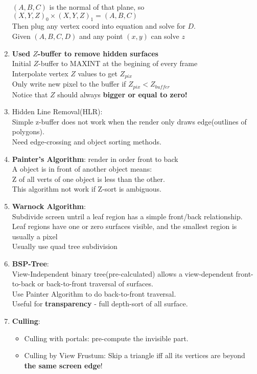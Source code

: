 \documentclass[cyan,normal,en]{elegantnote}
\begin{document}
\begin{enumerate}
	$(A,B,C)$ is the normal of that plane, so $(X,Y,Z)_0 \times (X,Y,Z)_1 = (A,B,C)$\\
	Then plug any vertex coord into equation and solve for $D$.\\
	Given $(A,B,C,D)$ and any point $(x,y)$ can solve $z$
	\item \textbf{Used $Z$-buffer to remove hidden surfaces}\\
	Initial $Z$-buffer to MAXINT at the begining of every frame\\
	Interpolate vertex $Z$ values to get $Z_{pix}$\\
	Only write new pixel to the buffer if $Z_{pix}<Z_{buffer}$\\
	Notice that $Z$ should always \textbf{bigger or equal to zero!}
	\item Hidden Line Removal(HLR):\\
	Simple z-buffer does not work when the render only draws edge(outlines of polygons).\\
	Need edge-crossing and object sorting methods.
	\item \textbf{Painter's Algorithm}: render in order front to back\\
	A object is in front of another object means:\\
	Z of all verts of one object is less than the other.\\
	This algorithm not work if Z-sort is ambiguous.
	\item \textbf{Warnock Algorithm}:\\
	Subdivide screen untril a leaf region has a simple front/back relationship.\\
	Leaf regions have one or zero surfaces visible, and the smallest region is usually a pixel\\
	Usually use quad tree subdivision
	\item \textbf{BSP-Tree}:\\
	View-Independent binary tree(pre-calculated) allows a view-dependent front-to-back or back-to-front traversal of surfaces.\\
	Use Painter Algorithm to do back-to-front traversal.\\
	Useful for \textbf{transparency} - full depth-sort of all surface.
	\item \textbf{Culling}:
	\begin{itemize}
		\item Culling with portals: pre-compute the invisible part.
		\item Culling by View Frustum: Skip a triangle iff all its vertices are beyond \textbf{the same screen edge}!\\

\end{itemize}
\end{enumerate}
\end{document}
